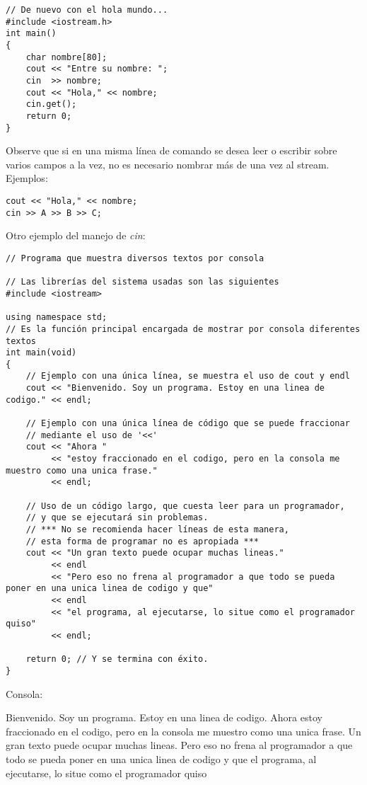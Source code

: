 \begin{lstlisting}[style=Cpp, label=operdirec, caption=Oper Direc]
// De nuevo con el hola mundo...
#include <iostream.h>
int main()
{
    char nombre[80];
    cout << "Entre su nombre: ";
    cin  >> nombre;
    cout << "Hola," << nombre;
    cin.get();
    return 0;
}
\end{lstlisting}

Observe que si en una misma línea de comando se desea leer o escribir sobre varios campos a la vez, no es necesario nombrar más de una vez al stream. Ejemplos:

\begin{lstlisting}[style=Cpp, label=ejemplo-ioc, caption=Ejemplo Cin Cout]
cout << "Hola," << nombre;
cin >> A >> B >> C;
\end{lstlisting}

Otro ejemplo del manejo de \textit{cin}:

\begin{lstlisting}[style=Cpp, label=impresión, caption=Impresión]
// Programa que muestra diversos textos por consola

// Las librerías del sistema usadas son las siguientes
#include <iostream>

using namespace std;
// Es la función principal encargada de mostrar por consola diferentes textos
int main(void)
{
    // Ejemplo con una única línea, se muestra el uso de cout y endl
    cout << "Bienvenido. Soy un programa. Estoy en una linea de codigo." << endl;

    // Ejemplo con una única línea de código que se puede fraccionar
    // mediante el uso de '<<'
    cout << "Ahora "
         << "estoy fraccionado en el codigo, pero en la consola me muestro como una unica frase."
         << endl;

    // Uso de un código largo, que cuesta leer para un programador,
    // y que se ejecutará sin problemas.
    // *** No se recomienda hacer líneas de esta manera,
    // esta forma de programar no es apropiada ***
    cout << "Un gran texto puede ocupar muchas lineas."
         << endl
         << "Pero eso no frena al programador a que todo se pueda poner en una unica linea de codigo y que"
         << endl
         << "el programa, al ejecutarse, lo situe como el programador quiso"
         << endl;

    return 0; // Y se termina con éxito.
}
\end{lstlisting}

Consola:

\begin{listing}[style=consola, numbers=none,label=resultado-impresión,caption=Resultado Impresión]
Bienvenido. Soy un programa. Estoy en una linea de codigo.
Ahora estoy fraccionado en el codigo, pero en la consola me muestro como una unica frase.
Un gran texto puede ocupar muchas lineas.
Pero eso no frena al programador a que todo se pueda poner en una unica linea de codigo y que
el programa, al ejecutarse, lo situe como el programador quiso

\end{listing}


